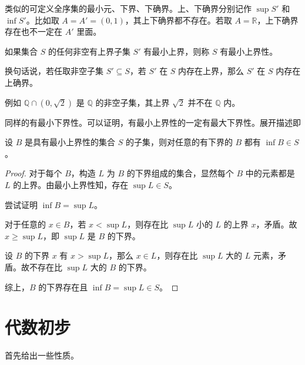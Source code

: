 类似的可定义全序集的最小元、下界、下确界。上、下确界分别记作 $\sup S'$ 和 $\inf S'$。比如取 $A = A' = (0, 1)$，其上下确界都不存在。若取 $A = \mathbb{R}$，上下确界存在也不一定在 $A'$ 里面。

\begin{definition}[最小上界性]
	如果集合 $S$ 的任何非空有上界子集 $S'$ 有最小上界，则称 $S$ 有最小上界性。

	换句话说，若任取非空子集 $S' \subseteq S$，若 $S'$ 在 $S$ 内存在上界，那么 $S'$ 在 $S$ 内存在上确界。
\end{definition}



例如 $\mathbb{Q} \cap (0,\sqrt2)$ 是 $\mathbb{Q}$ 的非空子集，其上界 $\sqrt2$ 并不在 $\mathbb{Q}$ 内。

同样的有最小下界性。可以证明，有最小上界性的一定有最大下界性。展开描述即

\begin{theorem}
	设 $B$ 是具有最小上界性的集合 $S$ 的子集，则对任意的有下界的 $B$ 都有 $\inf B \in S$。
\end{theorem}

\begin{proof}
	对于每个 $B$，构造 $L$ 为 $B$ 的下界组成的集合，显然每个 $B$ 中的元素都是 $L$ 的上界。由最小上界性知，存在 $\sup L \in S$。

	尝试证明 $\inf B=\sup L$。

	对于任意的 $x\in B$，若 $x<\sup L$，则存在比 $\sup L$ 小的 $L$ 的上界 $x$，矛盾。故 $x \geqslant \sup L$，即 $\sup L$ 是 $B$ 的下界。

	设 $B$ 的下界 $x$ 有 $x>\sup L$，那么 $x\in L$，则存在比 $\sup L$ 大的 $L$ 元素，矛盾。故不存在比 $\sup L$ 大的 $B$ 的下界。

	综上，$B$ 的下界存在且 $\inf B=\sup L \in S$。
\end{proof}

\section{代数初步}

首先给出一些性质。

